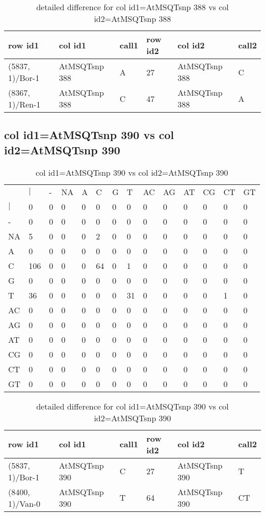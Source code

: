 \begin{center}
\begin{longtable}{|l|l|l|l|l|l|}
\caption{detailed difference for col id1=AtMSQTsnp 388 vs col id2=AtMSQTsnp 388} \label{table_dm707}\\
\hline
row id1&col id1&call1&row id2&col id2&call2\\
\hline
(5837, 1)/Bor-1&AtMSQTsnp 388&A&27&AtMSQTsnp 388&C\\
(8367, 1)/Ren-1&AtMSQTsnp 388&C&47&AtMSQTsnp 388&A\\
\hline
\end{longtable}
\end{center}

\subsection{col id1=AtMSQTsnp 390 vs col id2=AtMSQTsnp 390}
\begin{center}
\begin{longtable}{|l|l|l|l|l|l|l|l|l|l|l|l|l|l|}
\caption{col id1=AtMSQTsnp 390 vs col id2=AtMSQTsnp 390} \label{table_dm708}\\
\hline
\\
\hline
&$|$&-&NA&A&C&G&T&AC&AG&AT&CG&CT&GT\\
$|$&0&0&0&0&0&0&0&0&0&0&0&0&0\\
-&0&0&0&0&0&0&0&0&0&0&0&0&0\\
NA&5&0&0&0&2&0&0&0&0&0&0&0&0\\
A&0&0&0&0&0&0&0&0&0&0&0&0&0\\
C&106&0&0&0&64&0&1&0&0&0&0&0&0\\
G&0&0&0&0&0&0&0&0&0&0&0&0&0\\
T&36&0&0&0&0&0&31&0&0&0&0&1&0\\
AC&0&0&0&0&0&0&0&0&0&0&0&0&0\\
AG&0&0&0&0&0&0&0&0&0&0&0&0&0\\
AT&0&0&0&0&0&0&0&0&0&0&0&0&0\\
CG&0&0&0&0&0&0&0&0&0&0&0&0&0\\
CT&0&0&0&0&0&0&0&0&0&0&0&0&0\\
GT&0&0&0&0&0&0&0&0&0&0&0&0&0\\
\hline
\end{longtable}
\end{center}

\begin{center}
\begin{longtable}{|l|l|l|l|l|l|}
\caption{detailed difference for col id1=AtMSQTsnp 390 vs col id2=AtMSQTsnp 390} \label{table_dm709}\\
\hline
row id1&col id1&call1&row id2&col id2&call2\\
\hline
(5837, 1)/Bor-1&AtMSQTsnp 390&C&27&AtMSQTsnp 390&T\\
(8400, 1)/Van-0&AtMSQTsnp 390&T&64&AtMSQTsnp 390&CT\\
\hline
\end{longtable}
\end{center}

